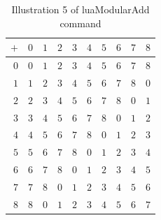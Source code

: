 ﻿\documentclass{article}
\begin{document}
\begin{table}[H]
\centering
\begin{tabular}{r|rrrrrrrrr}
\toprule
$+$ & $0$ & $1$ & $2$ & $3$ & $4$ & $5$ & $6$ & $7$ & $8$\\ \midrule $0$ & $0$ & $1$ & $2$ & $3$ & $4$ & $5$ & $6$ & $7$ & $8$\\ $1$ & $1$ & $2$ & $3$ & $4$ & $5$ & $6$ & $7$ & $8$ & $0$\\ $2$ & $2$ & $3$ & $4$ & $5$ & $6$ & $7$ & $8$ & $0$ & $1$\\ $3$ & $3$ & $4$ & $5$ & $6$ & $7$ & $8$ & $0$ & $1$ & $2$\\ $4$ & $4$ & $5$ & $6$ & $7$ & $8$ & $0$ & $1$ & $2$ & $3$\\ $5$ & $5$ & $6$ & $7$ & $8$ & $0$ & $1$ & $2$ & $3$ & $4$\\ $6$ & $6$ & $7$ & $8$ & $0$ & $1$ & $2$ & $3$ & $4$ & $5$\\ $7$ & $7$ & $8$ & $0$ & $1$ & $2$ & $3$ & $4$ & $5$ & $6$\\ $8$ & $8$ & $0$ & $1$ & $2$ & $3$ & $4$ & $5$ & $6$ & $7$ \\
\bottomrule
\end{tabular} 
\caption{Illustration 5 of luaModularAdd command}
\label{luamodadd5tbl}
\end{table}
\end{document}
